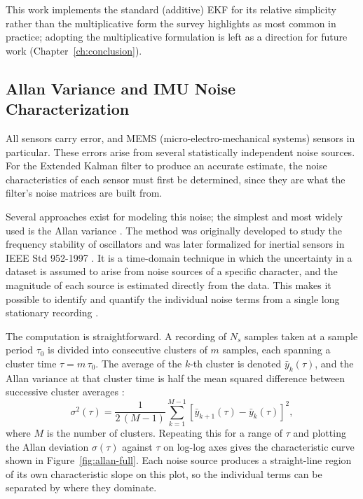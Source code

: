 \documentclass[12pt,a4paper]{article}
\begin{document}
This work implements the standard (additive) EKF for its relative simplicity rather than the multiplicative form the survey highlights as most common in
practice; adopting the multiplicative formulation is left as a
direction for future work (Chapter~\ref{ch:conclusion}).

\subsection{Allan Variance and IMU Noise Characterization}
\label{sec:allan-variance-fundamentals}

All sensors carry error, and MEMS (micro-electro-mechanical
systems) sensors in particular. These errors arise from several
statistically independent noise sources. For the Extended Kalman
filter to produce an accurate estimate, the noise characteristics
of each sensor must first be determined, since they are what the
filter's noise matrices are built from.

Several approaches exist for modeling this noise; the simplest and
most widely used is the Allan variance \citep{marinov2014allan}.
The method was originally developed to study the frequency
stability of oscillators \citep{allan1966statistics} and was later
formalized for inertial sensors in IEEE Std 952-1997
\citep{ieee952_1997}. It is a time-domain technique in which the
uncertainty in a dataset is assumed to arise from noise sources of
a specific character, and the magnitude of each source is estimated
directly from the data. This makes it possible to identify and
quantify the individual noise terms from a single long stationary
recording \citep{ieee952_1997}.

The computation is straightforward. A recording of $N_s$ samples
taken at a sample period $\tau_0$ is divided into consecutive
clusters of $m$ samples, each spanning a cluster time
$\tau = m\,\tau_0$. The average of the $k$-th cluster is denoted
$\bar{y}_k(\tau)$, and the Allan variance at that cluster time is
half the mean squared difference between successive cluster averages
\citep{ieee952_1997}:
\begin{equation}
  \sigma^2(\tau) = \frac{1}{2\,(M-1)} \sum_{k=1}^{M-1}
  \left[\bar{y}_{k+1}(\tau) - \bar{y}_k(\tau)\right]^2,
  \label{eq:allan-variance}
\end{equation}
where $M$ is the number of clusters. Repeating this for a range of
$\tau$ and plotting the Allan deviation $\sigma(\tau)$ against
$\tau$ on log-log axes gives the characteristic curve shown in
Figure~\ref{fig:allan-full}. Each noise source produces a
straight-line region of its own characteristic slope on this plot,
so the individual terms can be separated by where they dominate.
\end{document}
